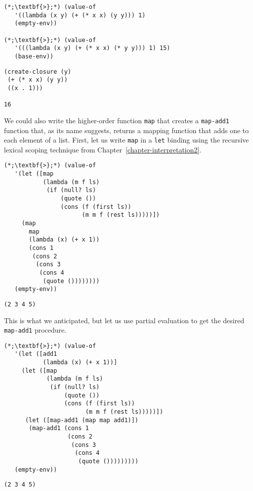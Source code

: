 \begin{clo}[]{}
\begin{lstlisting}[language=MySOutput]
(*;\textbf{>};*) (value-of 
   '((lambda (x y) (+ (* x x) (y y))) 1)
   (empty-env))

(*;\textbf{>};*) (value-of 
   '(((lambda (x y) (+ (* x x) (* y y))) 1) 15) 
   (base-env))
\end{lstlisting}
\tcblower
\begin{lstlisting}[language=MyOutput]
(create-closure (y) 
 (+ (* x x) (y y)) 
 ((x . 1)))
 
16
\end{lstlisting}
\end{clo}

We could also write the higher-order function \texttt{map} that creates a \texttt{map-add1} function that, as its name suggests, returns a mapping function that adds one to each element of a list. First, let us write \texttt{map} in a \texttt{let} binding using the recursive lexical scoping technique from Chapter~\ref{chapter-interpretation2}.

\begin{clo}[]{}
\begin{lstlisting}[language=MySOutput]
(*;\textbf{>};*) (value-of 
   '(let ([map 
           (lambda (m f ls)
            (if (null? ls)
                (quote ())
                (cons (f (first ls))
                      (m m f (rest ls)))))])
     (map 
       map 
       (lambda (x) (+ x 1))
       (cons 1 
        (cons 2 
         (cons 3 
          (cons 4 
           (quote ())))))))
   (empty-env))
\end{lstlisting}
\tcblower
\begin{lstlisting}[language=MyOutput]
(2 3 4 5)
\end{lstlisting}
\end{clo}

This is what we anticipated, but let us use partial evaluation to get the desired \texttt{map-add1} procedure.

\begin{clo}[]{}
\begin{lstlisting}[language=MySOutput]
(*;\textbf{>};*) (value-of 
   '(let ([add1
           (lambda (x) (+ x 1))]
     (let ([map 
            (lambda (m f ls)
             (if (null? ls)
                 (quote ())
                 (cons (f (first ls))
                       (m m f (rest ls)))))])
      (let ([map-add1 (map map add1)])
       (map-add1 (cons 1 
                  (cons 2 
                   (cons 3 
                    (cons 4 
                     (quote ()))))))))
   (empty-env))
\end{lstlisting}
\tcblower
\begin{lstlisting}[language=MyOutput]
(2 3 4 5)
\end{lstlisting}
\end{clo}